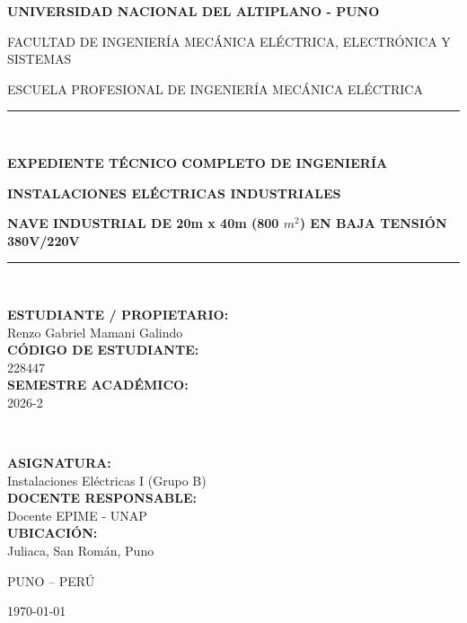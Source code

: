 \begin{titlepage}
\centering

{\Large\bfseries UNIVERSIDAD NACIONAL DEL ALTIPLANO - PUNO\par}
\vspace{0.3cm}
{\large FACULTAD DE INGENIERÍA MECÁNICA ELÉCTRICA, ELECTRÓNICA Y SISTEMAS\par}
{\large ESCUELA PROFESIONAL DE INGENIERÍA MECÁNICA ELÉCTRICA\par}

\vspace{1.5cm}

\rule{\linewidth}{1.5pt}\\[0.4cm]
{\Large\bfseries EXPEDIENTE TÉCNICO COMPLETO DE INGENIERÍA\par}
\vspace{0.3cm}
{\huge\bfseries INSTALACIONES ELÉCTRICAS INDUSTRIALES\par}
\vspace{0.3cm}
{\Large\bfseries NAVE INDUSTRIAL DE 20m x 40m (800 $m^2$) EN BAJA TENSIÓN 380V/220V\par}
\rule{\linewidth}{1.5pt}\\[1.5cm]

\begin{minipage}{0.48\textwidth}
\begin{flushleft} \large
\textbf{ESTUDIANTE / PROPIETARIO:}\\
Renzo Gabriel Mamani Galindo\\
\textbf{CÓDIGO DE ESTUDIANTE:}\\
228447\\
\textbf{SEMESTRE ACADÉMICO:}\\
2026-2
\end{flushleft}
\end{minipage}
~
\begin{minipage}{0.48\textwidth}
\begin{flushright} \large
\textbf{ASIGNATURA:}\\
Instalaciones Eléctricas I (Grupo B)\\
\textbf{DOCENTE RESPONSABLE:}\\
Docente EPIME - UNAP\\
\textbf{UBICACIÓN:}\\
Juliaca, San Román, Puno
\end{flushright}
\end{minipage}

\vfill

{\large PUNO -- PERÚ\par}
{\large\today\par}

\end{titlepage}
